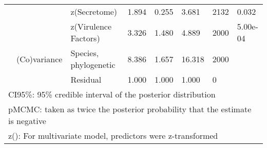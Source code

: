 \begin{table}
\begin{tabular}[t]{llllllll}
\hspace{1em} &  & z(Secretome) & 1.894 & 0.255 & 3.681 & 2132 & 0.032\\
\hspace{1em} &  & z(Virulence Factors) & 3.326 & 1.480 & 4.889 & 2000 & 5.00e-04\\
\hspace{1em} & (Co)variance & Species, phylogenetic & 8.386 & 1.657 & 16.318 & 2000 & \\
\hspace{1em} &  & Residual & 1.000 & 1.000 & 1.000 & 0 & \\
\bottomrule
\multicolumn{8}{l}{\rule{0pt}{1em}CI95\%: 95\% credible interval of the posterior distribution}\\
\multicolumn{8}{l}{\rule{0pt}{1em}pMCMC: taken as twice the posterior probability that the estimate is negative}\\
\multicolumn{8}{l}{\rule{0pt}{1em}z(): For multivariate model, predictors were z-transformed}\\
\end{tabular}
\end{table}
